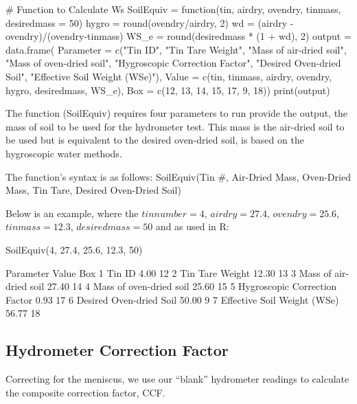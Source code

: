 \documentclass{tufte-handout}
\begin{document}
\begin{Schunk}
\begin{Sinput}
 # Function to Calculate Ws 
 SoilEquiv = function(tin, airdry, ovendry, tinmass, desiredmass = 50){
 hygro = round(ovendry/airdry, 2)
 wd = (airdry - ovendry)/(ovendry-tinmass)
 WS_e = round(desiredmass * (1 + wd), 2)
 output = data.frame(
   Parameter = c("Tin ID", "Tin Tare Weight", "Mass of air-dried soil", 
       "Mass of oven-dried soil", "Hygroscopic Correction Factor", 
       "Desired Oven-dried Soil", "Effective Soil Weight (WSe)"),
   Value = c(tin, tinmass, airdry, ovendry, hygro, desiredmass, WS_e),
   Box = c(12, 13, 14, 15, 17, 9, 18))
 print(output)
 }
\end{Sinput}
\end{Schunk}

The function (SoilEquiv) requires four parameters to run provide the output, the mass of soil to be used for the hydrometer test. This mass is the air-dried soil to be used but is equivalent to the desired oven-dried soil, is based on the hygroscopic water methods. 

The function's syntax is as follows: SoilEquiv(Tin \#, Air-Dried Mass, Oven-Dried Mass, Tin Tare, Desired Oven-Dried Soil)

Below is an example, where the $tin number = 4$, $airdry = 27.4$, $ovendry = 25.6$, $tinmass = 12.3$, $desiredmass = 50$ and as used in R: 

\begin{Schunk}
\begin{Sinput}
 SoilEquiv(4, 27.4, 25.6, 12.3, 50)
\end{Sinput}
\begin{Soutput}
                      Parameter Value Box
1                        Tin ID  4.00  12
2               Tin Tare Weight 12.30  13
3        Mass of air-dried soil 27.40  14
4       Mass of oven-dried soil 25.60  15
5 Hygroscopic Correction Factor  0.93  17
6       Desired Oven-dried Soil 50.00   9
7   Effective Soil Weight (WSe) 56.77  18
\end{Soutput}
\end{Schunk}


\subsection{Hydrometer Correction Factor}

Correcting for the meniscus, we use our ``blank'' hydrometer readings to calculate the composite correction factor, CCF. 
\end{document}
